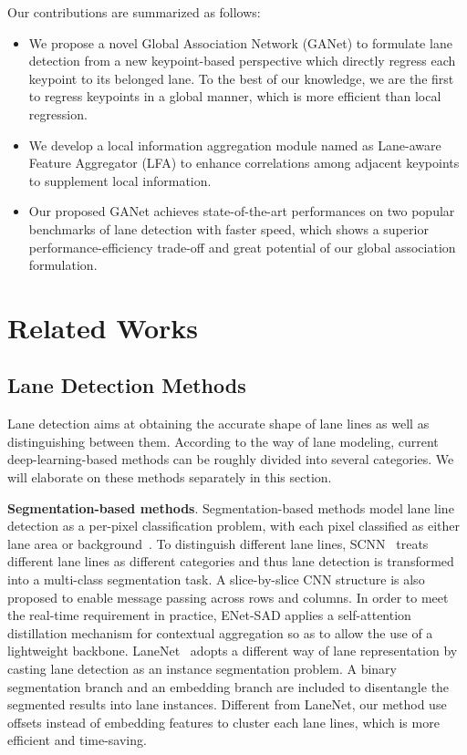 \documentclass[10pt,twocolumn,letterpaper]{article}
\begin{document}
Our contributions are summarized as follows:
\begin{itemize}
    \item We propose a novel Global Association Network (GANet) to formulate lane detection from a new keypoint-based perspective which directly regress each keypoint to its belonged lane. To the best of our knowledge, we are the first to regress keypoints in a global manner, which is more efficient than local regression.
    \item We develop a local information aggregation module named as Lane-aware Feature Aggregator (LFA) to enhance correlations among adjacent keypoints to supplement local information.
    \item Our proposed GANet achieves state-of-the-art performances on two popular benchmarks of lane detection with faster speed, which shows a superior performance-efficiency trade-off and great potential of our global association formulation.
\end{itemize}


\section{Related Works}
\subsection{Lane Detection Methods}
Lane detection aims at obtaining the accurate shape of lane lines as well as distinguishing between them.
According to the way of lane modeling, current deep-learning-based methods can be roughly divided into several categories. We will elaborate on these methods separately in this section.

\textbf{Segmentation-based methods}. Segmentation-based methods model lane line detection as a per-pixel classification problem, with each pixel classified as either lane area or background~\cite{pan2018spatial,Neven2018,Hou2019,jung2020towards}.
To distinguish different lane lines, SCNN~\cite{pan2018spatial} treats different lane lines as different categories and thus lane detection is transformed into a multi-class segmentation task. A slice-by-slice CNN structure is also proposed to enable message passing across rows and columns. 
In order to meet the real-time requirement in practice, ENet-SAD\cite{Hou2019} applies a self-attention distillation mechanism for contextual aggregation so as to allow the use of a lightweight backbone.
LaneNet~\cite{Neven2018} adopts a different way of lane representation by casting lane detection as an instance segmentation problem. A binary segmentation branch and an embedding branch are included to disentangle the segmented results into lane instances. 
Different from LaneNet, our method use offsets instead of embedding features to cluster each lane lines, which is more efficient and time-saving.
\end{document}

